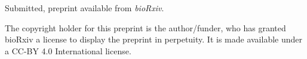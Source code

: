 \vspace{10pt}
\noindent Submitted, preprint available from \emph{bioRxiv}.

\vspace{60pt}
\noindent
The copyright holder for this preprint is the author/funder, who has
granted bioRxiv a license to display the preprint in perpetuity. It is
made available under a CC-BY 4.0 International license.

\cleardoublepage


















\restoregeometry

%
